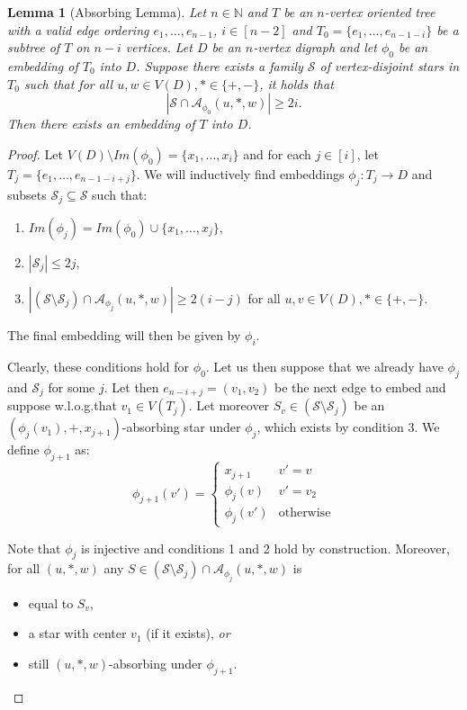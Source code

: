 \documentclass[10pt, a4paper]{article}
\newtheorem{lemma}[theorem]{Lemma}
\theoremstyle{remark}
\begin{document}
\begin{lemma}[Absorbing Lemma]\label{lemma:absorbing}
    Let $n\in \mathbb{N}$ and $T$ be an $n$-vertex oriented tree with a valid edge ordering $e_1, \dots, e_{n-1}$, $i \in [n-2]$ and $T_0 = \{ e_1, \dots, e_{n-1 - i}\}$ be a subtree of $T$ on $n-i$ vertices.
    Let $D$ be an $n$-vertex digraph and let $\phi_0$ be an embedding of $T_0$ into $D$.
    Suppose there exists a family $\mathcal{S}$ of vertex-disjoint stars in $T_0$ such that for all  $ u,w \in V(D), * \in \{+, -\}$, it holds that
    \[ |\mathcal{S} \cap \mathcal{A}_{\phi_0}(u,*,w)| \geq 2i.\]
    Then there exists an embedding of $T$ into $D$.
\end{lemma}
\begin{proof}
    Let $V(D) \setminus Im(\phi_0) = \{x_1, \dots, x_i\}$ and for each $j \in [i]$, let $T_{j} = \{ e_1, \dots, e_{n-1 - i + j}\}$.
    We will inductively find embeddings $\phi_j: T_j \to D$ and subsets $\mathcal{S}_j \subseteq \mathcal{S}$ such that:
    \begin{enumerate}
        \item $Im(\phi_j) = Im(\phi_0) \cup \{x_1, \dots, x_j\}$,
        \item $|\mathcal{S}_j| \leq 2j$,
        \item $|(\mathcal{S}\setminus \mathcal{S}_j) \cap \mathcal{A}_{\phi_j}(u,*,w)| \geq 2(i-j)$ for all $u,v \in V(D), * \in \{+, -\}.$
    \end{enumerate}
    The final embedding will then be given by $\phi_i$.

    Clearly, these conditions hold for $\phi_0$.
    Let us then suppose that we already have $\phi_j$ and $\mathcal{S}_j$ for some $j$.
    Let then $e_{n - i + j} = (v_1, v_2)$ be the next edge to embed and suppose w.l.o.g.\footnotemark that $v_1 \in V(T_j)$.
    Let moreover $S_v \in (\mathcal{S}\setminus \mathcal{S}_j)$ be an $(\phi_j(v_1), +, x_{j+1})$-absorbing star under $\phi_j$,
    which exists by condition 3.
    We define $\phi_{j+1}$ as:
    \[\phi_{j+1}(v') = \begin{cases}
        x_{j+1} & v' = v \\
        \phi_j(v) & v' = v_2 \\
        \phi_j(v') & \text{otherwise}
    \end{cases}\]

    Note that $\phi_j$ is injective and conditions 1 and 2 hold by construction.
    Moreover, for all $(u,*,w)$ any $S \in (\mathcal{S}\setminus \mathcal{S}_j) \cap \mathcal{A}_{\phi_j}(u,*,w)$ is
    \begin{itemize}
        \item equal to $S_v$,
        \item a star with center $v_1$ (if it exists), \emph{or}
        \item still $(u,*,w)$-absorbing under $\phi_{j+1}$.
    \end{itemize}
    

\end{proof}
\end{document}

